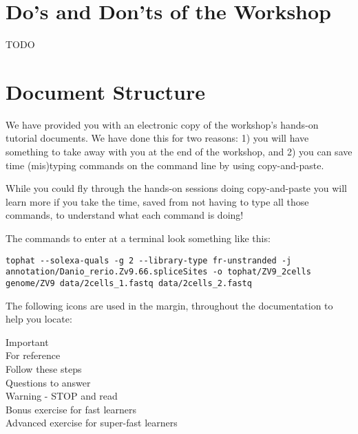 %
%
\newpage

\section{Do's and Don'ts of the Workshop}
TODO

\section{Document Structure}
We have provided you with an electronic copy of the workshop's hands-on tutorial documents.
We have done this for two reasons: 1) you will have something to take away with you at the 
end of the workshop, and 2) you can save time (mis)typing commands on the command line by using
copy-and-paste.

\begin{warning}
While you could fly through the hands-on sessions doing
copy-and-paste you will learn more if you take the time, saved from not having to type all those
commands, to understand what each command is doing!
\end{warning}

The commands to enter at a terminal look something like this:
\begin{lstlisting}
tophat --solexa-quals -g 2 --library-type fr-unstranded -j annotation/Danio_rerio.Zv9.66.spliceSites -o tophat/ZV9_2cells genome/ZV9 data/2cells_1.fastq data/2cells_2.fastq
\end{lstlisting}  

The following icons are used in the margin, throughout the documentation to help you locate:

\hspace*{.2cm} Important\\
\hspace*{.2cm} For reference\\
\hspace*{.2cm} Follow these steps\\
\hspace*{.2cm} Questions to answer\\
\hspace*{.2cm} Warning - STOP and read\\
\hspace*{.2cm} Bonus exercise for fast learners\\
\hspace*{.2cm} Advanced exercise for super-fast learners\\
